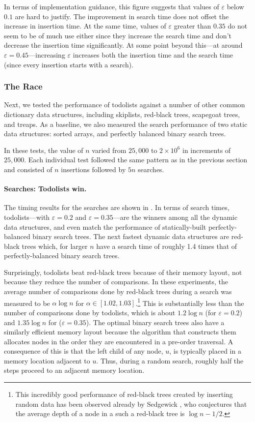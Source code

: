 \documentclass{patmorin}
\newcommand{\eps}{\varepsilon}
\begin{document}
In terms of implementation guidance, this figure suggests that values
of $\eps$ below $0.1$ are hard to justify.  The improvement in search
time does not offset the increase in insertion time.  At the same
time, values of $\eps$ greater than $0.35$ do not seem to be of much
use either since they increase the search time and don't decrease the
insertion time significantly. At some point beyond this---at around
$\eps=0.45$---increasing $\eps$ increases both the insertion time and
the search time (since every insertion starts with a search).


\subsubsection{The Race}

Next, we tested the performance of todolists against a number of other
common dictionary data structures, including skiplists, red-black trees,
scapegoat trees, and treaps. As a baseline, we also measured the search
performance of two static data structures: sorted arrays, and perfectly
balanced binary search trees.

In these tests, the value of $n$ varied from $25,000$ to $2\times 10^6$
in increments of $25,000$.   Each individual test followed the same
pattern as in the previous section and consisted of $n$ insertions
followed by $5n$ searches.

\paragraph{Searches: Todolists win.}
The timing results for the searches are shown in . In
terms of search times, todolists---with $\eps = 0.2$ and $\eps=0.35$---are
the winners among all the dynamic data structures, and even match the
performance of statically-built perfectly-balanced binary search trees.
The next fastest dynamic data structures are red-black trees which,
for larger $n$ have a search time of roughly 1.4 times that of
perfectly-balanced binary search trees.

Surprisingly, todolists beat red-black trees because of their memory
layout, not because they reduce the number of comparisons. In
these experiments, the average number of comparisons done by
red-black trees during a search was measured to be $\alpha\log n$
for $\alpha\in[1.02,1.03]$.\footnote{This incredibly good performance
of red-black trees created by inserting random data has been observed
already by Sedgewick \cite{sedgewick:left-leaning}, who conjectures
that the average depth of a node in a such a red-black tree is $\log
n-1/2$.} This is substantially less than the number of comparisons done
by todolists, which is about $1.2\log n$ (for $\eps=0.2$) and $1.35\log
n$ for ($\eps=0.35$). The optimal binary search trees also have a
similarly efficient memory layout because the algorithm that constructs
them allocates nodes in the order they are encountered in a pre-order
traversal. A consequence of this is that the left child of any node,
$u$, is typically placed in a memory location adjacent to $u$.  Thus,
during a random search, roughly half the steps proceed to an adjacent
memory location.
\end{document}
